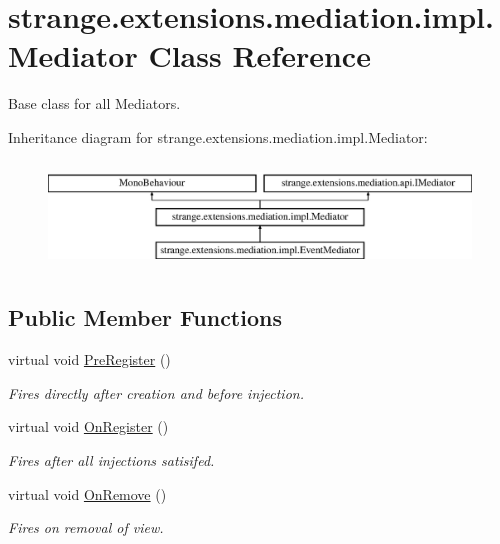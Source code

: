 \hypertarget{classstrange_1_1extensions_1_1mediation_1_1impl_1_1_mediator}{\section{strange.\-extensions.\-mediation.\-impl.\-Mediator Class Reference}
\label{classstrange_1_1extensions_1_1mediation_1_1impl_1_1_mediator}
}


Base class for all Mediators.  


Inheritance diagram for strange.\-extensions.\-mediation.\-impl.\-Mediator\-:\begin{figure}[H]
\begin{center}
\leavevmode
\includegraphics[height=2.857143cm]{classstrange_1_1extensions_1_1mediation_1_1impl_1_1_mediator}
\end{center}
\end{figure}
\subsection*{Public Member Functions}
\begin{DoxyCompactItemize}
\item 
\hypertarget{classstrange_1_1extensions_1_1mediation_1_1impl_1_1_mediator_a014246a5f07c3685e5d567700dd94d7a}{virtual void \hyperlink{classstrange_1_1extensions_1_1mediation_1_1impl_1_1_mediator_a014246a5f07c3685e5d567700dd94d7a}{Pre\-Register} ()}\label{classstrange_1_1extensions_1_1mediation_1_1impl_1_1_mediator_a014246a5f07c3685e5d567700dd94d7a}

\begin{DoxyCompactList}\small\item\em Fires directly after creation and before injection. \end{DoxyCompactList}\item 
virtual void \hyperlink{classstrange_1_1extensions_1_1mediation_1_1impl_1_1_mediator_a9ebac485743098c35f48fb9fecc3a8da}{On\-Register} ()
\begin{DoxyCompactList}\small\item\em Fires after all injections satisifed. \end{DoxyCompactList}\item 
virtual void \hyperlink{classstrange_1_1extensions_1_1mediation_1_1impl_1_1_mediator_a09e316a7e7fd37d5d11fe5cff0f9a8d1}{On\-Remove} ()
\begin{DoxyCompactList}\small\item\em Fires on removal of view. \end{DoxyCompactList}\end{DoxyCompactItemize}
